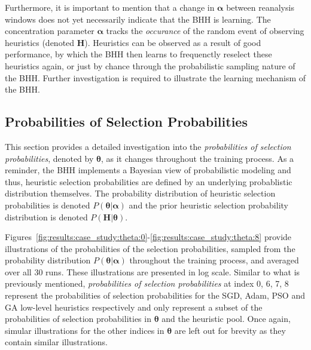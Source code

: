 Furthermore, it is important to mention that a change in $\boldsymbol{\alpha}$ between reanalysis windows does not yet necessarily indicate that the \acs{BHH} is learning. The concentration parameter $\boldsymbol{\alpha}$ tracks the \textit{occurance} of the random event of observing heuristics (denoted $\boldsymbol{{H}}$). Heuristics can be observed as a result of good performance, by which the \acs{BHH} then learns to frequenctly reselect these heuristics again, or just by chance through the probabilistic sampling nature of the \acs{BHH}. Further investigation is required to illustrate the learning mechanism of the \acs{BHH}.




\subsection{Probabilities of Selection Probabilities}\label{sec:results:case_study:probs_of_select_probs}

This section provides a detailed investigation into the \textit{probabilities of selection probabilities}, denoted by $\boldsymbol{\theta}$, as it changes throughout the training process. As a reminder, the \acs{BHH} implements a Bayesian view of probabilistic modeling and thus, heuristic selection probabilities are defined by an underlying probablistic distribution themselves. The probability distribution of heuristic selection probabilities is denoted $P(\boldsymbol{\theta} \vert \boldsymbol{\alpha})$ and the prior heuristic selection probability distribution is denoted $P(\boldsymbol{H} \vert \boldsymbol{\theta})$.

Figures~\ref{fig:results:case_study:theta:0}-\ref{fig:results:case_study:theta:8} provide illustrations of the probabilities of the selection probabilities, sampled from the probability distribution $P(\boldsymbol{\theta} \vert \boldsymbol{\alpha})$ throughout the training process, and averaged over all 30 runs. These illustrations are presented in log scale. Similar to what is previously mentioned, \textit{probabilities of selection probabilities} at index 0, 6, 7, 8 represent the probabilities of selection probabilities for the \acs{SGD}, \acs{Adam}, \acs{PSO} and \acs{GA} low-level heuristics respectively and only represent a subset of the probabilities of selection probabilities in $\boldsymbol{\theta}$ and the heuristic pool. Once again, simular illustrations for the other indices in $\boldsymbol{\theta}$ are left out for brevity as they contain similar illustrations.


